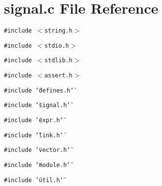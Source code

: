 \section{signal.c File Reference}
\label{signal_8c}
{\tt \#include $<$string.h$>$}\par
{\tt \#include $<$stdio.h$>$}\par
{\tt \#include $<$stdlib.h$>$}\par
{\tt \#include $<$assert.h$>$}\par
{\tt \#include \char`\"{}defines.h\char`\"{}}\par
{\tt \#include \char`\"{}signal.h\char`\"{}}\par
{\tt \#include \char`\"{}expr.h\char`\"{}}\par
{\tt \#include \char`\"{}link.h\char`\"{}}\par
{\tt \#include \char`\"{}vector.h\char`\"{}}\par
{\tt \#include \char`\"{}module.h\char`\"{}}\par
{\tt \#include \char`\"{}util.h\char`\"{}}\par
